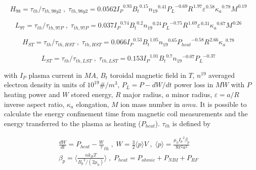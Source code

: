\begin{equation}
{ H }_{ 98 }={\tau }_{ th }/{\tau }_{ th,98y2 } \; , \; {\tau }_{ th,98y2 }=0.0562 {{ I }_{ P }}^{ 0.93} {{ B }_{ t }}^{ 0.15} {{ n }_{ 19 }}^{ 0.41} {{ P }_{ L }}^{ -0.69} {{ R }_{  }}^{ 1.97} {{ \varepsilon  }_{  }}^{ 0.58} {{ \kappa  }_{ a }}^{ 0.78} {{ M }_{  }}^{ 0.19}
\label{eq:h98y2}
\end{equation}

\begin{equation}
{ L }_{ 97 }={\tau }_{ th }/{\tau }_{ th,97P } \; , \; {\tau }_{ th,97P }=0.037 {{ I }_{ P }}^{ 0.74} {{ B }_{ t }}^{ 0.2} {{ n }_{ 19 }}^{ 0.24} {{ P }_{ L }}^{ -0.75} {{ R }_{  }}^{ 1.69} {{ \varepsilon  }_{  }}^{ 0.31} {{ \kappa  }_{ a }}^{ 0.67} {{ M }_{  }}^{ 0.26}
\label{eq:l97}
\end{equation}


\begin{equation}
{ H }_{ ST }={\tau }_{ th }/{\tau }_{ th,HST } \; , \; {\tau }_{ th,HST }=0.066 {{ I }_{ P }}^{ 0.53} {{ B }_{ t }}^{ 1.05} {{ n }_{ 19 }}^{ 0.65} {{ P }_{ heat }}^{ -0.58} {{ R }_{  }}^{ 2.66} {{ \kappa  }_{ a }}^{ 0.78}
\label{eq:HST}
\end{equation}

\begin{equation}
{ L }_{ ST }={\tau }_{ th }/{\tau }_{ th,LST } \; , \; {\tau }_{ th,LST }=0.153 {{ I }_{ P }}^{ 1.01} {{ B }_{ t }}^{ 0.7} {{ n }_{ 19 }}^{ -0.07} {{ P }_{ L }}^{ -0.37}
\label{eq:LST}
\end{equation}

with $I_P$ plasma current in $MA$, $B_t$ toroidal magnetic field in $T$, $n^{19}$ averaged electron density in units of $10^{19} \#/m^3$, $P_L=P-dW/dt$ power loss in $MW$ with $P$ heating power and $W$ stored energy, $R$ major radius, $a$ minor radius, $\varepsilon=a/R$ inverse aspect ratio, $\kappa _a$ elongation, $M$ ion mass number in $amu$.
It is possible to calculate the energy confinement time from magnetic coil measurements and the energy transferred to the plasma as heating ($P_{heat}$). $\tau_{th}$ is defined by 

\begin{equation}
\begin{split}
\frac {dW} {dt}={P}_{heat} - \frac {W} {\tau }_{ th } \; , \; W=\frac { 3} {2} \langle p \rangle V \; , \; \langle p \rangle = \frac {{ \mu }_{ 0 } {{ I }_{ p }}^{ 2 } { \beta }_{ p }} { 8 {\pi}^{2} {a}^{2}  } \\ {\beta }_{ p } = \langle \frac { n {k}_{B} T} { {{B}_{p}}^{2} /(2 {\mu}_{0}) } \rangle \; , \; {P }_{ heat }={ P }_{ ohmic }+{ P }_{ NBI }+{ P }_{ RF }
\label{eq:tau}
\end{split}
\end{equation}


